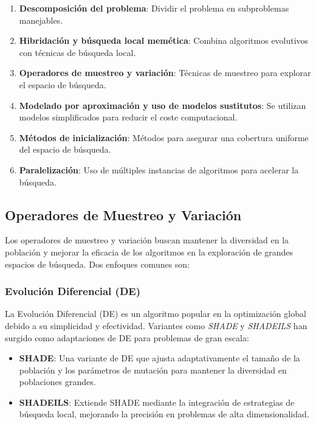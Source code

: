 \begin{enumerate}
    \item \textbf{Descomposición del problema}: Dividir el problema en subproblemas manejables.
    \item \textbf{Hibridación y búsqueda local memética}: Combina algoritmos evolutivos con técnicas de búsqueda local.
    \item \textbf{Operadores de muestreo y variación}: Técnicas de muestreo para explorar el espacio de búsqueda.
    \item \textbf{Modelado por aproximación y uso de modelos sustitutos}: Se utilizan modelos simplificados para reducir el coste computacional.
    \item \textbf{Métodos de inicialización}: Métodos para asegurar una cobertura uniforme del espacio de búsqueda.
    \item \textbf{Paralelización}: Uso de múltiples instancias de algoritmos para acelerar la búsqueda.
\end{enumerate}



\subsection*{Operadores de Muestreo y Variación}

Los operadores de muestreo y variación buscan mantener la diversidad en la población y mejorar la eficacia de los algoritmos en la exploración de grandes espacios de búsqueda. Dos enfoques comunes son:

\subsubsection*{Evolución Diferencial (DE)}

La Evolución Diferencial (DE) es un algoritmo popular en la optimización global debido a su simplicidad y efectividad. Variantes como \textit{SHADE} y \textit{SHADEILS} han surgido como adaptaciones de DE para problemas de gran escala:
\begin{itemize}
    \item \textbf{SHADE}: Una variante de DE que ajusta adaptativamente el tamaño de la población y los parámetros de mutación para mantener la diversidad en poblaciones grandes.
    \item \textbf{SHADEILS}: Extiende SHADE mediante la integración de estrategias de búsqueda local, mejorando la precisión en problemas de alta dimensionalidad.
\end{itemize}

